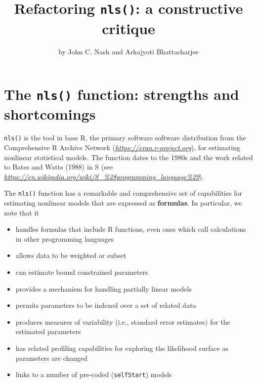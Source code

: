 \title{Refactoring \texttt{nls()}: a constructive critique}
\author{by John C. Nash and Arkajyoti Bhattacharjee}

\maketitle


\hypertarget{the-nls-function-strengths-and-shortcomings}{%
\section{\texorpdfstring{The \texttt{nls()} function: strengths and shortcomings}{The nls() function: strengths and shortcomings}}\label{the-nls-function-strengths-and-shortcomings}}

\texttt{nls()} is the tool in base R, the primary software software distribution
from the Comprehensive R Archive Network (\emph{\url{https://cran.r-project.org}}),
for estimating nonlinear statistical models. The function dates to the 1980s and
the work related to Bates and Watts (1988) in S (see \emph{\url{https://en.wikipedia.org/wiki/S_\%28programming_language\%29}}).

The \texttt{nls()} function has a remarkable and comprehensive set of capabilities for
estimating nonlinear models that are expressed as \textbf{formulas}. In particular, we note that it

\begin{itemize}
\tightlist
\item
  handles formulas that include R functions, even ones which call calculations in
  other programming languages
\item
  allows data to be weighted or subset
\item
  can estimate bound constrained parameters
\item
  provides a mechanism for handling partially linear models
\item
  permits parameters to be indexed over a set of related data
\item
  produces measures of variability (i.e., standard error estimates) for the
  estimated parameters
\item
  has related profiling capabilities for exploring the likelihood surface as
  parameters are changed
\item
  links to a number of pre-coded (\texttt{selfStart}) models
\end{itemize}

